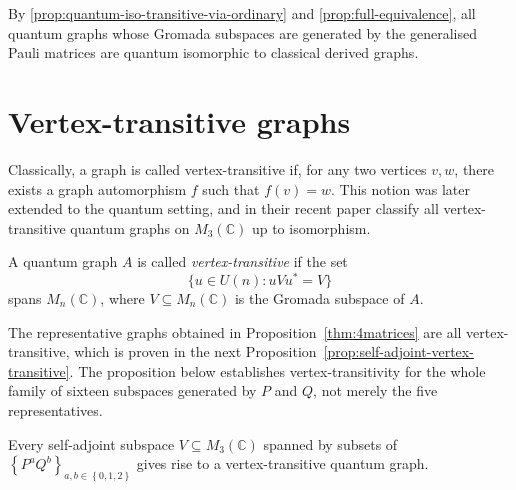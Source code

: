 \begin{remark}
    By \ref{prop:quantum-iso-transitive-via-ordinary} and
    \ref{prop:full-equivalence}, all quantum graphs
    whose Gromada subspaces are generated by the generalised Pauli matrices
    are quantum isomorphic to classical derived graphs.
\end{remark}

\section{Vertex-transitive graphs}
\label{sec:vertex-transitive-graphs}
Classically, a graph is called vertex-transitive if, for any two
vertices \( v, w \), there exists a graph automorphism \( f \) such that
\( f(v) = w \). This notion was later extended to the quantum
setting, and in their recent paper \textcite{hayes26} classify all
vertex-transitive quantum graphs on \( M_{3}(\mathbb{C}) \) up to isomorphism.

\begin{definition}
    \label{def:vertex-transitive}
    A quantum graph \( A \) is called \emph{vertex-transitive}
    if the set
    \[
        \{ u \in U(n) : uVu^* = V \}
    \]
    spans \( M_n(\mathbb{C}) \), where \( V \subseteq M_n(\mathbb{C})
    \) is the Gromada subspace of \( A \).
\end{definition}

The representative graphs obtained in Proposition~\ref{thm:4matrices}
are all vertex-transitive, which is proven in the next
Proposition~\ref{prop:self-adjoint-vertex-transitive}. The
proposition below establishes vertex-transitivity for the whole family
of sixteen subspaces generated by \( P \) and \( Q \), not merely the
five representatives.

\begin{proposition}
    \label{prop:self-adjoint-vertex-transitive}
    Every self-adjoint subspace \( V \subseteq M_{3}(\mathbb{C})
    \) spanned by subsets of \( \left\{ P^a Q^b \right\}_{a, b \in
    \left\{ 0, 1, 2 \right\}} \) gives rise to a vertex-transitive
    quantum graph.
\end{proposition}

